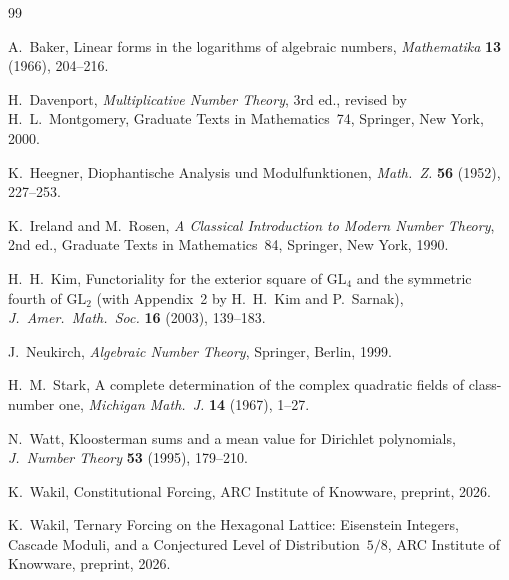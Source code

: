 \documentclass[12pt]{amsart}
\theoremstyle{plain}
\theoremstyle{definition}
\theoremstyle{remark}
\begin{document}
\begin{thebibliography}{99}


A.~Baker,
Linear forms in the logarithms of algebraic numbers,
\emph{Mathematika} \textbf{13} (1966), 204--216.

H.~Davenport,
\emph{Multiplicative Number Theory}, 3rd ed., revised by H.~L.~Montgomery,
Graduate Texts in Mathematics~74, Springer, New York, 2000.

K.~Heegner,
Diophantische Analysis und Modulfunktionen,
\emph{Math.\ Z.} \textbf{56} (1952), 227--253.

K.~Ireland and M.~Rosen,
\emph{A Classical Introduction to Modern Number Theory}, 2nd ed.,
Graduate Texts in Mathematics~84, Springer, New York, 1990.

H.~H.~Kim,
Functoriality for the exterior square of $\mathrm{GL}_4$ and the symmetric
fourth of $\mathrm{GL}_2$ (with Appendix~2 by H.~H.~Kim and P.~Sarnak),
\emph{J.\ Amer.\ Math.\ Soc.} \textbf{16} (2003), 139--183.

J.~Neukirch,
\emph{Algebraic Number Theory},
Springer, Berlin, 1999.

H.~M.~Stark,
A complete determination of the complex quadratic fields of
class-number one,
\emph{Michigan Math.\ J.} \textbf{14} (1967), 1--27.

N.~Watt,
Kloosterman sums and a mean value for Dirichlet polynomials,
\emph{J.\ Number Theory} \textbf{53} (1995), 179--210.


K.~Wakil,
Constitutional Forcing,
ARC Institute of Knowware, preprint, 2026.

K.~Wakil,
Ternary Forcing on the Hexagonal Lattice: Eisenstein Integers, Cascade
Moduli, and a Conjectured Level of Distribution~$5/8$,
ARC Institute of Knowware, preprint, 2026.

\end{thebibliography}
\end{document}
